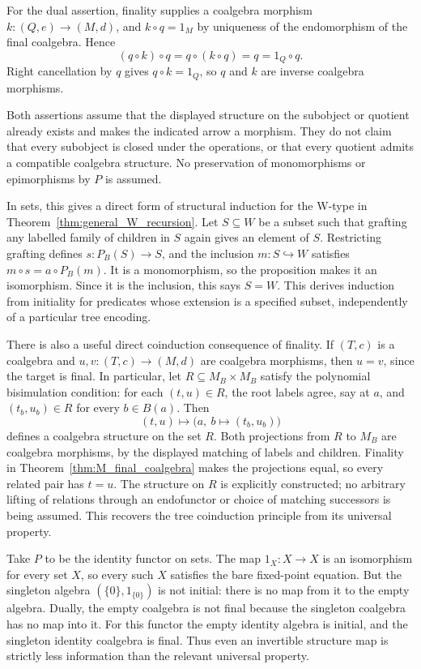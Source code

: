For the dual assertion, finality supplies a coalgebra morphism
$k:(Q,e)\to(M,d)$, and $k\circ q=1_M$ by uniqueness of the
endomorphism of the final coalgebra. Hence
\[
(q\circ k)\circ q=q\circ(k\circ q)=q=1_Q\circ q.
\]
Right cancellation by $q$ gives $q\circ k=1_Q$, so $q$ and $k$
are inverse coalgebra morphisms.
\Done

Both assertions assume that the displayed structure on the subobject
or quotient already exists and makes the indicated arrow a morphism.
They do not claim that every subobject is closed under the operations,
or that every quotient admits a compatible coalgebra structure. No
preservation of monomorphisms or epimorphisms by $P$ is assumed.

In sets, this gives a direct form of structural induction for the
W-type in Theorem~\ref{thm:general_W_recursion}. Let $S\subseteq W$
be a subset such that grafting any labelled family of children in $S$
again gives an element of $S$. Restricting grafting defines
$s:P_B(S)\to S$, and the inclusion $m:S\hookrightarrow W$ satisfies
$m\circ s=a\circ P_B(m)$. It is a monomorphism, so the proposition
makes it an isomorphism. Since it is the inclusion, this says $S=W$.
This derives induction from initiality for predicates whose extension
is a specified subset, independently of a particular tree encoding.

There is also a useful direct coinduction consequence of finality.
If $(T,c)$ is a coalgebra and $u,v:(T,c)\to(M,d)$ are coalgebra
morphisms, then $u=v$, since the target is final. In particular, let
$R\subseteq M_B\times M_B$ satisfy the polynomial bisimulation
condition: for each $(t,u)\in R$, the root labels agree, say at $a$,
and $(t_b,u_b)\in R$ for every $b\in B(a)$. Then
\[
(t,u)\longmapsto\bigl(a,\ b\longmapsto(t_b,u_b)\bigr)
\]
defines a coalgebra structure on the set $R$. Both projections from
$R$ to $M_B$ are coalgebra morphisms, by the displayed matching of
labels and children. Finality in Theorem~\ref{thm:M_final_coalgebra}
makes the projections equal, so every related pair has $t=u$.
The structure on $R$ is explicitly constructed; no arbitrary lifting
of relations through an endofunctor or choice of matching successors
is being assumed. This recovers the tree coinduction principle from
its universal property.

\begin{example}
Take $P$ to be the identity functor on sets. The map $1_X:X\to X$ is
an isomorphism for every set $X$, so every such $X$ satisfies the bare
fixed-point equation. But the singleton algebra $(\{0\},1_{\{0\}})$
is not initial: there is no map from it to the empty algebra.
Dually, the empty coalgebra is not final because the singleton coalgebra
has no map into it. For this functor the empty identity algebra is
initial, and the singleton identity coalgebra is final. Thus even an
invertible structure map is strictly less information than the relevant
universal property.
\end{example}



